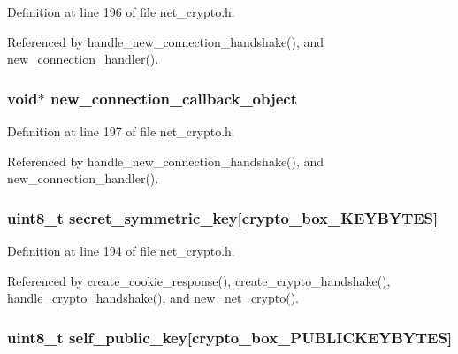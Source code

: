 Definition at line 196 of file net\+\_\+crypto.\+h.



Referenced by handle\+\_\+new\+\_\+connection\+\_\+handshake(), and new\+\_\+connection\+\_\+handler().

\hypertarget{struct_net___crypto_af28bac95ede5cab8426b07e02dd1a1b0}{
\subsubsection[{new\+\_\+connection\+\_\+callback\+\_\+object}]{\setlength{\rightskip}{0pt plus 5cm}void$\ast$ new\+\_\+connection\+\_\+callback\+\_\+object}}\label{struct_net___crypto_af28bac95ede5cab8426b07e02dd1a1b0}


Definition at line 197 of file net\+\_\+crypto.\+h.



Referenced by handle\+\_\+new\+\_\+connection\+\_\+handshake(), and new\+\_\+connection\+\_\+handler().

\hypertarget{struct_net___crypto_ab9f2ff47bc0b1e5110202a6e4be86390}{
\subsubsection[{secret\+\_\+symmetric\+\_\+key}]{\setlength{\rightskip}{0pt plus 5cm}uint8\+\_\+t secret\+\_\+symmetric\+\_\+key\mbox{[}{\bf crypto\+\_\+box\+\_\+\+K\+E\+Y\+B\+Y\+T\+E\+S}\mbox{]}}}\label{struct_net___crypto_ab9f2ff47bc0b1e5110202a6e4be86390}


Definition at line 194 of file net\+\_\+crypto.\+h.



Referenced by create\+\_\+cookie\+\_\+response(), create\+\_\+crypto\+\_\+handshake(), handle\+\_\+crypto\+\_\+handshake(), and new\+\_\+net\+\_\+crypto().

\hypertarget{struct_net___crypto_ae726df8bdc26380e5a6c3187a00d6881}{
\subsubsection[{self\+\_\+public\+\_\+key}]{\setlength{\rightskip}{0pt plus 5cm}uint8\+\_\+t self\+\_\+public\+\_\+key\mbox{[}crypto\+\_\+box\+\_\+\+P\+U\+B\+L\+I\+C\+K\+E\+Y\+B\+Y\+T\+E\+S\mbox{]}}}\label{struct_net___crypto_ae726df8bdc26380e5a6c3187a00d6881}


